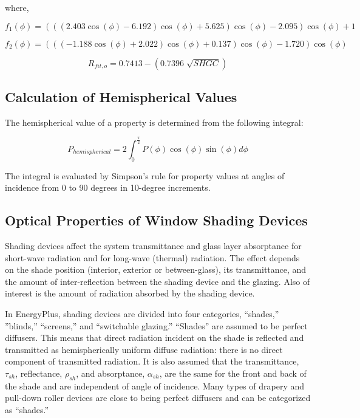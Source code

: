 where,

\begin{equation}
{f_1}\left( \phi  \right) = \left( {\left( {\left( {2.403\cos \left( \phi  \right) - 6.192} \right)\cos \left( \phi  \right) + 5.625} \right)\cos \left( \phi  \right) - 2.095} \right)\cos \left( \phi  \right) + 1
\end{equation}

\begin{equation}
{f_2}\left( \phi  \right) = \left( {\left( {\left( { - 1.188\cos \left( \phi  \right) + 2.022} \right)\cos \left( \phi  \right) + 0.137} \right)\cos \left( \phi  \right) - 1.720} \right)\cos \left( \phi  \right)
\end{equation}

\begin{equation}
{R_{fit,o}} = 0.7413 - \left( {0.7396\;\sqrt {SHGC} } \right)
\end{equation}

\subsection{Calculation of Hemispherical Values}\label{calculation-of-hemispherical-values}

The hemispherical value of a property is determined from the following integral:

\begin{equation}
{P_{hemispherical}} = 2\int_0^{\frac{\pi }{2}} {P(\phi )\cos (\phi )\sin (\phi )d\phi }
\end{equation}

The integral is evaluated by Simpson's rule for property values at angles of incidence from 0 to 90 degrees in 10-degree increments.

\subsection{Optical Properties of Window Shading Devices}\label{optical-properties-of-window-shading-devices}

Shading devices affect the system transmittance and glass layer absorptance for short-wave radiation and for long-wave (thermal) radiation. The effect depends on the shade position (interior, exterior or between-glass), its transmittance, and the amount of inter-reflection between the shading device and the glazing. Also of interest is the amount of radiation absorbed by the shading device.

In EnergyPlus, shading devices are divided into four categories, ``shades,'' ''blinds,'' ``screens,'' and ``switchable glazing.'' ``Shades'' are assumed to be perfect diffusers. This means that direct radiation incident on the shade is reflected and transmitted as hemispherically uniform diffuse radiation: there is no direct component of transmitted radiation. It is also assumed that the transmittance, \(\tau_{sh}\), reflectance, \(\rho_{sh}\), and absorptance, \(\alpha_{sh}\), are the same for the front and back of the shade and are independent of angle of incidence. Many types of drapery and pull-down roller devices are close to being perfect diffusers and can be categorized as ``shades.''


